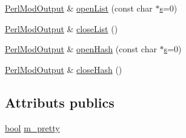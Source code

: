 \begin{DoxyCompactItemize}
\item 
\hyperlink{class_perl_mod_output}{Perl\+Mod\+Output} \& \hyperlink{class_perl_mod_output_a98d9e21faa376f774072ded1b97f7b72}{open\+List} (const char $\ast$\hyperlink{060__command__switch_8tcl_a011c73f2dbb87635a3b4206c72355f6e}{s}=0)
\item 
\hyperlink{class_perl_mod_output}{Perl\+Mod\+Output} \& \hyperlink{class_perl_mod_output_a7c2d76ccf51197fd1a0db53c0179f14c}{close\+List} ()
\item 
\hyperlink{class_perl_mod_output}{Perl\+Mod\+Output} \& \hyperlink{class_perl_mod_output_ad3f263a6a01a737ea0f48f1301a0c63b}{open\+Hash} (const char $\ast$\hyperlink{060__command__switch_8tcl_a011c73f2dbb87635a3b4206c72355f6e}{s}=0)
\item 
\hyperlink{class_perl_mod_output}{Perl\+Mod\+Output} \& \hyperlink{class_perl_mod_output_a105173f8b051fdea4d34c6a161792b5f}{close\+Hash} ()
\end{DoxyCompactItemize}
\subsection*{Attributs publics}
\begin{DoxyCompactItemize}
\item 
\hyperlink{qglobal_8h_a1062901a7428fdd9c7f180f5e01ea056}{bool} \hyperlink{class_perl_mod_output_a814c200c15b3842ff2671f28a69db498}{m\+\_\+pretty}
\end{DoxyCompactItemize}
